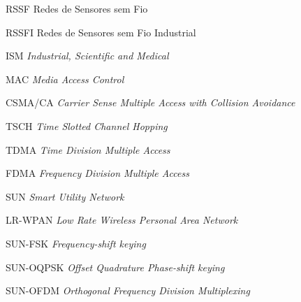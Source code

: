 \listoffigures*
\cleardoublepage

\listoftables*
\cleardoublepage

\begin{siglas}
  \item[RSSF] Redes de Sensores sem Fio
  \item[RSSFI] Redes de Sensores sem Fio Industrial
  \item[ISM] \textit{Industrial, Scientific and Medical}
  \item[MAC] \textit{Media Access Control}
  \item[CSMA/CA] \textit{Carrier Sense Multiple Access with Collision Avoidance}
  \item[TSCH] \textit{Time Slotted Channel Hopping}
  \item[TDMA] \textit{Time Division Multiple Access} 
  \item[FDMA] \textit{Frequency Division Multiple Access}
  \item[SUN] \textit{Smart Utility Network}
  \item[LR-WPAN] \textit{Low Rate Wireless Personal Area Network}
  \item[SUN-FSK] \textit{Frequency-shift keying}
  \item[SUN-OQPSK] \textit{Offset Quadrature Phase-shift keying}
  \item[SUN-OFDM] \textit{Orthogonal Frequency Division Multiplexing}
\end{siglas}

